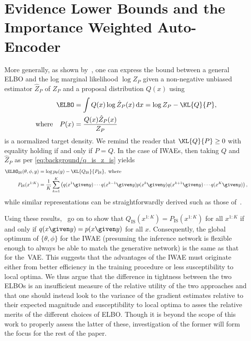
\section{Evidence Lower Bounds and the Importance Weighted Auto-Encoder}

More generally, as shown by~\cite{Maddison2017filtering,anonymous2018auto-encoding}, one can express the bound
between a general \gls{ELBO} and the log marginal likelihood $\log Z_P$ given a non-negative unbiased estimator $\hat{Z}_P$
of $Z_P$ and a proposal distribution $Q(x)$ using
\begin{align}
\ELBO &= \int Q(x) \log \hat Z_P(x) \,\mathrm dx = \log Z_P - \KL{Q}{P},
\label{eqn:aesmc/bias/elbo3} \\
\text{where} \quad P(x) &= \frac{Q(x) \hat Z_P(x)}{Z_P} \label{eqn:aesmc/bias/P}
\end{align}
is a normalized target density.  We remind the reader that $\KL{Q}{P}\ge0$ with equality holding if and only if
$P=Q$.
In the case of \glspl{IWAE}, then taking $Q$ and $\hat Z_P$ as per \eqref{eq:background/q_is_z_is} yields
\begin{align}
\ELBO_{\text{IS}}(\theta, \phi, y) &= \log p_{\theta}(y) - \KL{Q_{\text{IS}}}{P_{\text{IS}}}, \text{ where } \label{eqn:aesmc/bias/elbo_is} \\
P_{\text{IS}}(x^{1:K}) &= \frac{1}{K} \sum_{k = 1}^K \left(q(x^1 \given y) \cdots q(x^{k - 1} \given y) p(x^k \given y) q(x^{k + 1} \given y) \cdots q(x^K \given y) \right),
\end{align}
while similar representations can be straightforwardly derived such as those of~\cite{Le2017auto,Maddison2017filtering,Naesseth2017variational}.

Using these results,~\cite{anonymous2018auto-encoding} go on to show that
$Q_{\text{IS}}(x^{1:K}) = P_{\text{IS}}(x^{1:K})$ for all $x^{1:K}$ if and only if $q(x \given y) = p(x \given y)$ for all $x$.
Consequently, the global optimum of $\{\theta,\phi\}$ for the \gls{IWAE} (presuming the inference network is flexible enough to always be able to
match the generative network) is the same as that for the~\gls{VAE}.  This
suggests that the advantages of the \gls{IWAE} must
originate either from better efficiency in the training procedure or less susceptibility 
to local optima. We thus
argue that the difference in tightness between the two \glspl{ELBO} is an insufficient measure of the relative utility of the two
approaches and that one should instead look to the variance of the gradient estimates relative to their expected magnitude and
susceptibility to local optima to asses the relative merits of the different choices of \gls{ELBO}.  Though it is beyond the
scope of this work to properly assess the latter of these, investigation of the former will form the focus for the rest of the paper.